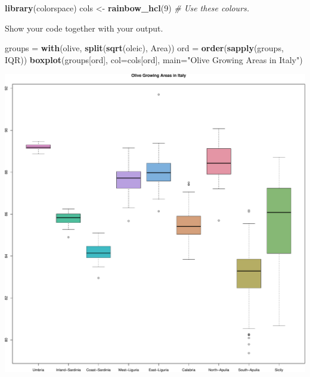 \documentclass[9pt,letter]{article}
\newenvironment{Shaded}{\begin{snugshade}}{\end{snugshade}}
\newcommand{\KeywordTok}[1]{\textcolor[rgb]{0.13,0.29,0.53}{\textbf{#1}}}
\newcommand{\DataTypeTok}[1]{\textcolor[rgb]{0.13,0.29,0.53}{#1}}
\newcommand{\DecValTok}[1]{\textcolor[rgb]{0.00,0.00,0.81}{#1}}
\newcommand{\StringTok}[1]{\textcolor[rgb]{0.31,0.60,0.02}{#1}}
\newcommand{\CommentTok}[1]{\textcolor[rgb]{0.56,0.35,0.01}{\textit{#1}}}
\newcommand{\NormalTok}[1]{#1}
\begin{document}
\begin{Shaded}
\begin{Highlighting}[]
\KeywordTok{library}\NormalTok{(colorspace)}
\NormalTok{cols <-}\StringTok{ }\KeywordTok{rainbow_hcl}\NormalTok{(}\DecValTok{9}\NormalTok{) }\CommentTok{# Use these colours.}
\end{Highlighting}
\end{Shaded}

Show your code together with your output.

\begin{Shaded}
\begin{Highlighting}[]
\NormalTok{groups =}\StringTok{ }\KeywordTok{with}\NormalTok{(olive, }\KeywordTok{split}\NormalTok{(}\KeywordTok{sqrt}\NormalTok{(oleic), Area))}
\NormalTok{ord =}\StringTok{ }\KeywordTok{order}\NormalTok{(}\KeywordTok{sapply}\NormalTok{(groups, IQR))}
\KeywordTok{boxplot}\NormalTok{(groups[ord], }\DataTypeTok{col=}\NormalTok{cols[ord], }
        \DataTypeTok{main=}\StringTok{"Olive Growing Areas in Italy"}\NormalTok{)}
\end{Highlighting}
\end{Shaded}

\begin{center}\includegraphics{a4_solutions_files/figure-latex/unnamed-chunk-12-1} \end{center}
\end{document}
